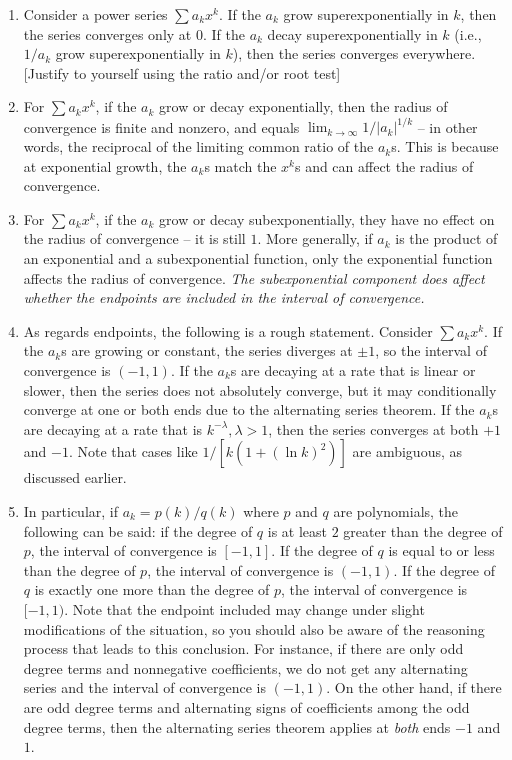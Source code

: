 \documentclass{amsart}
\begin{document}
\begin{enumerate}
\item Consider a power series $\sum a_kx^k$. If the $a_k$ grow
  superexponentially in $k$, then the series converges only at $0$. If
  the $a_k$ decay superexponentially in $k$ (i.e., $1/a_k$ grow
  superexponentially in $k$), then the series converges
  everywhere. [Justify to yourself using the ratio and/or root test]
\item For $\sum a_kx^k$, if the $a_k$ grow or decay exponentially,
  then the radius of convergence is finite and nonzero, and equals
  $\lim_{k \to \infty} 1/|a_k|^{1/k}$ -- in other words, the
  reciprocal of the limiting common ratio of the $a_k$s. This is
  because at exponential growth, the $a_k$s match the $x^k$s and can
  affect the radius of convergence.
\item For $\sum a_kx^k$, if the $a_k$ grow or decay subexponentially,
  they have no effect on the radius of convergence -- it is still
  $1$. More generally, if $a_k$ is the product of an exponential and a
  subexponential function, only the exponential function affects the
  radius of convergence. {\em The subexponential component does affect
  whether the endpoints are included in the interval of convergence.}
\item As regards endpoints, the following is a rough
  statement. Consider $\sum a_kx^k$. If the $a_k$s are growing or
  constant, the series diverges at $\pm 1$, so the interval of
  convergence is $(-1,1)$. If the $a_k$s are decaying at a rate that
  is linear or slower, then the series does not absolutely converge,
  but it may conditionally converge at one or both ends due to the
  alternating series theorem. If the $a_k$s are decaying at a rate
  that is $k^{-\lambda}, \lambda > 1$, then the series converges at
  both $+1$ and $-1$. Note that cases like $1/[k(1 + (\ln k)^2)]$ are
  ambiguous, as discussed earlier.
\item In particular, if $a_k = p(k)/q(k)$ where $p$ and $q$ are
  polynomials, the following can be said: if the degree of $q$ is at
  least $2$ greater than the degree of $p$, the interval of
  convergence is $[-1,1]$. If the degree of $q$ is equal to or less
  than the degree of $p$, the interval of convergence is $(-1,1)$. If
  the degree of $q$ is exactly one more than the degree of $p$, the
  interval of convergence is $[-1,1)$. Note that the endpoint included
  may change under slight modifications of the situation, so you
  should also be aware of the reasoning process that leads to this
  conclusion. For instance, if there are only odd degree terms and
  nonnegative coefficients, we do not get any alternating series and
  the interval of convergence is $(-1,1)$. On the other hand, if there
  are odd degree terms and alternating signs of coefficients among the
  odd degree terms, then the alternating series theorem applies at
  {\em both} ends $-1$ and $1$.
\end{enumerate}
\end{document}
